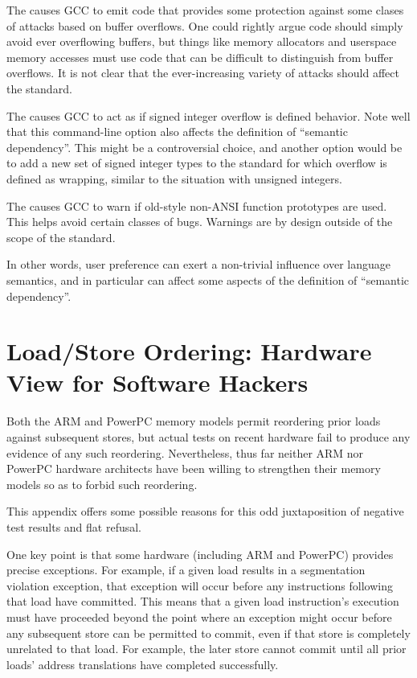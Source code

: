 \documentclass[10]{article}
\begin{document}
The  causes GCC to emit code that provides
some protection against some clases of attacks based on buffer overflows.
One could rightly argue code should simply avoid ever overflowing buffers,
but things like memory allocators and userspace memory accesses must
use code that can be difficult to distinguish from buffer overflows.
It is not clear that the ever-increasing variety of attacks should
affect the standard.

The  causes GCC to act as if signed integer
overflow is defined behavior.
Note well that this command-line option also affects the definition of
``semantic dependency''.
This might be a controversial choice, and another option would be to add
a new set of signed integer types to the standard for which overflow is
defined as wrapping, similar to the situation with unsigned integers.

The  causes GCC to warn if old-style
non-ANSI function prototypes are used.
This helps avoid certain classes of bugs.
Warnings are by design outside of the scope of the standard.

In other words, user preference can exert a non-trivial influence over
language semantics, and in particular can affect some aspects of the
definition of ``semantic dependency''.

\clearpage

\section{Load/Store Ordering: Hardware View for Software Hackers}
\label{sec:Load/Store Ordering: Hardware View for Software Hackers}


Both the ARM and PowerPC memory models permit reordering prior loads
against subsequent stores, but actual tests on recent hardware fail to
produce any evidence of any such reordering.
Nevertheless, thus far neither ARM nor PowerPC hardware architects
have been willing to strengthen their memory models so as to forbid
such reordering.

This appendix offers some possible reasons for this odd juxtaposition
of negative test results and flat refusal.

One key point is that some hardware (including ARM and PowerPC) provides
precise exceptions.
For example, if a given load results in a segmentation violation
exception, that exception will occur before any instructions following
that load have committed.
This means that a given load instruction's execution must have proceeded
beyond the point where an exception might occur before any subsequent
store can be permitted to commit, even if that store is completely
unrelated to that load.
For example, the later store cannot commit until all prior loads' address
translations have completed successfully.
\end{document}
